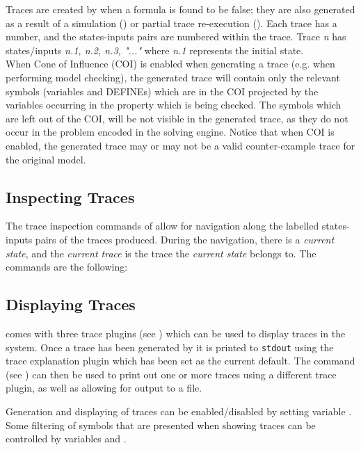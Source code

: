 Traces are created by \nusmv when a formula is found to be false; they
are also generated as a result of a simulation () or partial trace re-execution (). Each trace has a number, and the states-inputs pairs are
numbered within the trace.  Trace {\it n} has states/inputs {\it n.1,
  n.2, n.3, "..."} where \textit{n.1} represents the initial state.\\

When Cone of Influence (COI) is enabled when generating a trace
(e.g. when performing model checking), the generated trace will
contain only the relevant symbols (variables and DEFINEs) which are
in the COI projected by the variables occurring in the property
which is being checked. The symbols which are left out of the COI,
will be not visible in the generated trace, as they do not occur in
the problem encoded in the solving engine. Notice that when COI is
enabled, the generated trace may or may not be a valid
counter-example trace for the original model.

\subsection{Inspecting Traces}
\label{Inspecting Traces}
%
The trace inspection commands of \nusmv allow for navigation along the
labelled states-inputs pairs of the traces produced. During the
navigation, there is a {\it current state}, and the {\it current
trace} is the trace the {\it current state} belongs to. The commands
are the following:





\subsection{Displaying Traces}
\label{Displaying Traces}
%
\nusmv comes with three trace plugins (see ) which
can be used to display traces in the system. Once a trace has been
generated by \nusmv it is printed to \texttt{stdout} using the trace
explanation plugin which has been set as the current default. The
command  (see ) can
then be used to print out one or more traces using a different trace
plugin, as well as allowing for output to a file.

Generation and displaying of traces can be enabled/disabled by
setting variable . Some filtering of
symbols that are presented when showing traces can be controlled
by variables  and 
.

